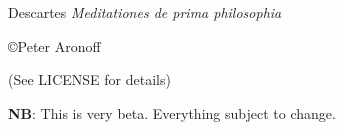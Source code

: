 \begin{titlepage}

\begin{center}

\huge Descartes \textit{Meditationes de prima philosophia}

\vskip2in

\large \copyright Peter Aronoff \the\year

(See LICENSE for details)

\vskip1in

\textbf{NB}: This is very beta. Everything subject to change.

\vskip2in

\newpage

\end{center}

\end{titlepage}

